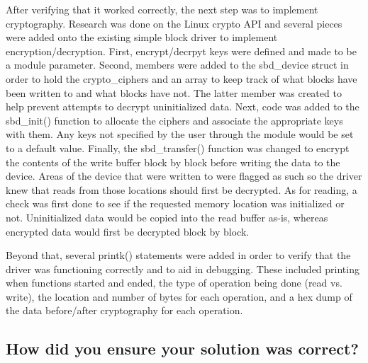 \documentclass[letterpaper,10pt,titlepage,draftclsnofoot,onecolumn]{article}
\begin{document}
After verifying that it worked correctly, the next step was to implement cryptography. Research was done on the Linux crypto API and several pieces were added onto the existing simple block driver to implement encryption/decryption. First, encrypt/decrpyt keys were defined and made to be a module parameter. Second, members were added to the sbd\_device struct in order to hold the crypto\_ciphers and an array to keep track of what blocks have been written to and what blocks have not. The latter member was created to help prevent attempts to decrypt uninitialized data. Next, code was added to the sbd\_init() function to allocate the ciphers and associate the appropriate keys with them. Any keys not specified by the user through the module would be set to a default value. Finally, the sbd\_transfer() function was changed to encrypt the contents of the write buffer block by block before writing the data to the device. Areas of the device that were written to were flagged as such so the driver knew that reads from those locations should first be decrypted. As for reading, a check was first done to see if the requested memory location was initialized or not. Uninitialized data would be copied into the read buffer as-is, whereas encrypted data would first be decrypted block by block.

Beyond that, several printk() statements were added in order to verify that the driver was functioning correctly and to aid in debugging. These included printing when functions started and ended, the type of operation being done (read vs. write), the location and number of bytes for each operation, and a hex dump of the data before/after cryptography for each operation.

\subsection{How did you ensure your solution was correct?}
\end{document}
